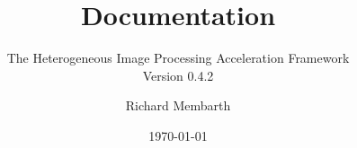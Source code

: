 


\title{\hipacc{} Documentation}
\subtitle{The Heterogeneous Image Processing Acceleration Framework\\Version 0.4.2}
\author{Richard Membarth}
\date{\today}

\maketitle

\cleardoublepage
\tableofcontents
\cleardoublepage






\nocite{membarth2011ggc}
\nocite{membarth2012gdg}
\nocite{membarth2012aoi}
\nocite{membarth2012msv}
\cleardoublepage
\appendix





